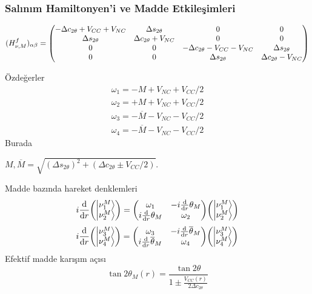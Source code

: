 \documentclass[10pt]{beamer}
\begin{document}
\begin{frame}
    \frametitle{Salınım Hamiltonyen'i ve Madde Etkileşimleri}
    \hrulefill
    \tiny
    \begin{align*}
        (H^{f}_{\nu,M})_{\alpha\beta} =\mqty(-\Delta c_{ 2\theta}+V_{CC}+V_{NC} & \Delta s_{ 2\theta} & 0 & 0\\ \Delta s_{ 2\theta} & \Delta c_{ 2\theta}+V_{NC} & 0 & 0 \\0 & 0 & -\Delta c_{ 2\theta}-V_{CC}-V_{NC} & \Delta s_{ 2\theta}\\ 0 & 0 & \Delta s_{ 2\theta} & \Delta c_{ 2\theta}-V_{NC} )
    \end{align*}
    \normalsize
    \hrulefill

    \begin{minipage}{0.45\textwidth}
    Özdeğerler
    \tiny
    \begin{align*}
        \omega_{1} = {-M + V_{NC}+ V_{CC}/2} \\
        \omega_{2} = {+M + V_{NC}+ V_{CC}/2} \\
        \omega_{3} = {-\overline{M} - V_{NC}- V_{CC}/2}\\
        \omega_{4} = {-\overline{M} - V_{NC}- V_{CC}/2}
    \end{align*}
    \normalsize
    Burada

    {\tiny $ M, \overline{M} = \sqrt{(\Delta s_{ 2\theta})^{2}+(\Delta c_{2\theta} \pm V_{CC}/2 ) } $}.

    \end{minipage}
    \hfill
    \begin{minipage}{0.45\textwidth}
        Madde bazında hareket denklemleri
        \tiny
        \begin{equation*}
            i \dv{r} \mqty(\ket{\nu^{M}_{1}}\\ \ket{\nu^{M}_{2}}) = \mqty(\omega_{1} & -i \dv{r}\theta_{M} \\ i \dv{r}\theta_{M} & \omega_{2}) \mqty(\ket{\nu^{M}_{1}}\\ \ket{\nu^{M}_{2}})
        \end{equation*}
        \begin{equation*}
	        i \dv{r} \mqty(\ket{\nu^{M}_{3}}\\ \ket{\nu^{M}_{4}}) = \mqty(\omega_{3} & -i \dv{r}\overline{\theta}_{M} \\ i \dv{r}\overline{\theta}_{M} & \omega_{4}) \mqty(\ket{\nu^{M}_{3}}\\ \ket{\nu^{M}_{4}})
        \end{equation*}
        \normalsize
        Efektif madde karışım açısı
        \begin{equation*}
            \tan 2\theta_{M}(r) = \frac{\tan 2\theta}{1\pm \frac{V_{CC}(r)}{2\Delta c_{2\theta}}}
        \end{equation*}
    \end{minipage}
\end{frame}
\end{document}

